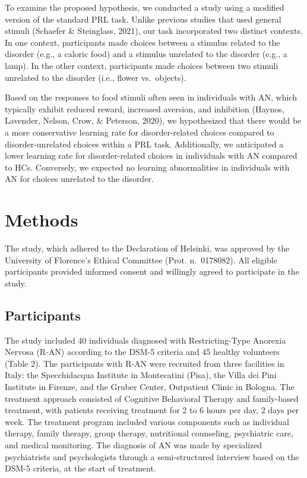 \documentclass[
  man,floatsintext]{apa6}
\begin{document}
To examine the proposed hypothesis, we conducted a study using a modified version of the standard PRL task. Unlike previous studies that used general stimuli (Schaefer \& Steinglass, 2021), our task incorporated two distinct contexts. In one context, participants made choices between a stimulus related to the disorder (e.g., a caloric food) and a stimulus unrelated to the disorder (e.g., a lamp). In the other context, participants made choices between two stimuli unrelated to the disorder (i.e., flower vs.~objects).

Based on the responses to food stimuli often seen in individuals with AN, which typically exhibit reduced reward, increased aversion, and inhibition (Haynos, Lavender, Nelson, Crow, \& Peterson, 2020), we hypothesized that there would be a more conservative learning rate for disorder-related choices compared to disorder-unrelated choices within a PRL task. Additionally, we anticipated a lower learning rate for disorder-related choices in individuals with AN compared to HCs. Conversely, we expected no learning abnormalities in individuals with AN for choices unrelated to the disorder.

\hypertarget{methods}{%
\section{Methods}\label{methods}}

The study, which adhered to the Declaration of Helsinki, was approved by the University of Florence's Ethical Committee (Prot. n.~0178082). All eligible participants provided informed consent and willingly agreed to participate in the study.

\hypertarget{participants}{%
\subsection{Participants}\label{participants}}

The study included 40 individuals diagnosed with Restricting-Type Anorexia Nervosa (R-AN) according to the DSM-5 criteria and 45 healthy volunteers (Table 2). The participants with R-AN were recruited from three facilities in Italy: the Specchidacqua Institute in Montecatini (Pisa), the Villa dei Pini Institute in Firenze, and the Gruber Center, Outpatient Clinic in Bologna. The treatment approach consisted of Cognitive Behavioral Therapy and family-based treatment, with patients receiving treatment for 2 to 6 hours per day, 2 days per week. The treatment program included various components such as individual therapy, family therapy, group therapy, nutritional counseling, psychiatric care, and medical monitoring. The diagnosis of AN was made by specialized psychiatrists and psychologists through a semi-structured interview based on the DSM-5 criteria, at the start of treatment.
\end{document}
